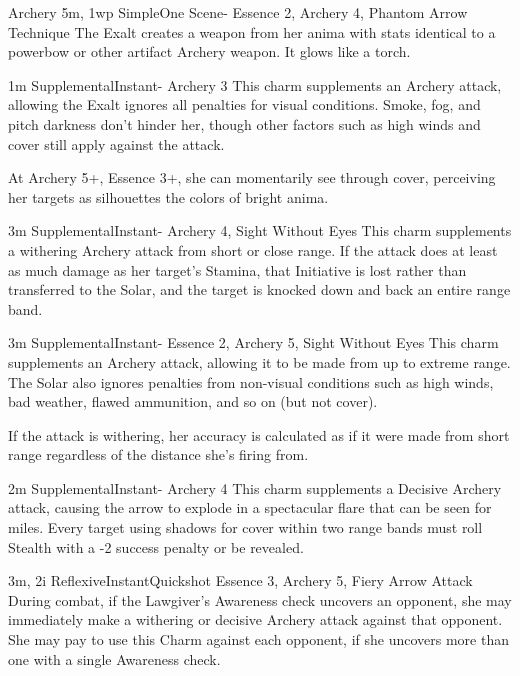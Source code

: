 \begin{Ability}{Archery}
  {5m, 1wp}
  {Simple}{One Scene}{-}
  {Essence 2, Archery 4, Phantom Arrow Technique}
  The Exalt creates a weapon from her anima with stats identical to a powerbow or other artifact Archery weapon. It glows like a torch.

  {1m}
  {Supplemental}{Instant}{-}
  {Archery 3}
  This charm supplements an Archery attack, allowing the Exalt ignores all penalties for visual conditions. Smoke, fog, and pitch darkness don't hinder her, though other factors such as high winds and cover still apply against the attack.

  At Archery 5+, Essence 3+, she can momentarily see through cover, perceiving her targets as silhouettes the colors of bright anima.

  {3m}
  {Supplemental}{Instant}{-}
  {Archery 4, Sight Without Eyes}
  This charm supplements a withering Archery attack from short or close range. If the attack does at least as much damage as her target's Stamina, that Initiative is lost rather than transferred to the Solar, and the target is knocked down and back an entire range band.

  {3m}
  {Supplemental}{Instant}{-}
  {Essence 2, Archery 5, Sight Without Eyes}
  This charm supplements an Archery attack, allowing it to be made from up to extreme range. The Solar also ignores penalties from non-visual conditions such as high winds, bad weather, flawed ammunition, and so on (but not cover).

  If the attack is withering, her accuracy is calculated as if it were made from short range regardless of the distance she's firing from.

  {2m}
  {Supplemental}{Instant}{-}
  {Archery 4}
  This charm supplements a Decisive Archery attack, causing the arrow to explode in a spectacular flare that can be seen for miles. Every target using shadows for cover within two range bands must roll Stealth with a -2 success penalty or be revealed.

  {3m, 2i}
  {Reflexive}{Instant}{Quickshot}
  {Essence 3, Archery 5, Fiery Arrow Attack}
  During combat, if the Lawgiver's Awareness check uncovers an opponent, she may immediately make a withering or decisive Archery attack against that opponent. She may pay to use this Charm against each opponent, if she uncovers more than one with a single Awareness check.

\end{Ability}

